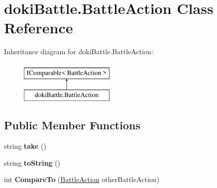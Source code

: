 \hypertarget{classdoki_battle_1_1_battle_action}{}\section{doki\+Battle.\+Battle\+Action Class Reference}
\label{classdoki_battle_1_1_battle_action}
Inheritance diagram for doki\+Battle.\+Battle\+Action\+:\begin{figure}[H]
\begin{center}
\leavevmode
\includegraphics[height=2.000000cm]{classdoki_battle_1_1_battle_action}
\end{center}
\end{figure}
\subsection*{Public Member Functions}
\begin{DoxyCompactItemize}
\item 
string {\bfseries take} ()\hypertarget{classdoki_battle_1_1_battle_action_aaa51e2ad08ba9c2e579a1fe426c95dfa}{}\label{classdoki_battle_1_1_battle_action_aaa51e2ad08ba9c2e579a1fe426c95dfa}

\item 
string {\bfseries to\+String} ()\hypertarget{classdoki_battle_1_1_battle_action_a3c495a0e70cc5df683c74e393d31a18e}{}\label{classdoki_battle_1_1_battle_action_a3c495a0e70cc5df683c74e393d31a18e}

\item 
int {\bfseries Compare\+To} (\hyperlink{classdoki_battle_1_1_battle_action}{Battle\+Action} other\+Battle\+Action)\hypertarget{classdoki_battle_1_1_battle_action_a73646cb17a98c6c78bd084161a27f721}{}\label{classdoki_battle_1_1_battle_action_a73646cb17a98c6c78bd084161a27f721}

\end{DoxyCompactItemize}
